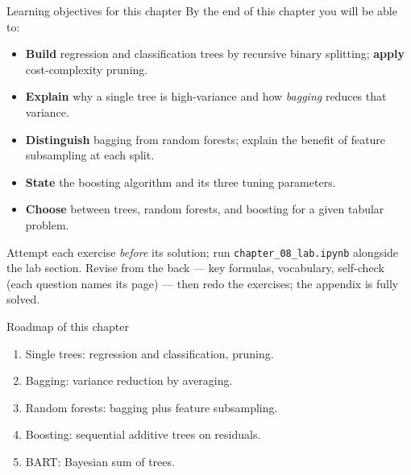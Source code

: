 \documentclass[aspectratio=169,11pt]{beamer}
\begin{document}
\begin{frame}{Learning objectives for this chapter}
  \small
  By the end of this chapter you will be able to:
  \begin{itemize}
    \item \textbf{Build} regression and classification trees by
          recursive binary splitting; \textbf{apply} cost-complexity
          pruning.
    \item \textbf{Explain} why a single tree is high-variance and how
          \emph{bagging} reduces that variance.
    \item \textbf{Distinguish} bagging from random forests; explain
          the benefit of feature subsampling at each split.
    \item \textbf{State} the boosting algorithm and its three tuning
          parameters.
    \item \textbf{Choose} between trees, random forests, and boosting
          for a given tabular problem.
  \end{itemize}
  \begin{readme}
    \footnotesize Attempt each exercise \emph{before} its solution; run
    \texttt{chapter\_08\_lab.ipynb} alongside the lab section. Revise from the
    back --- key formulas, vocabulary, self-check (each question names its
    page) --- then redo the exercises; the appendix is fully solved.
  \end{readme}
\end{frame}


\begin{frame}{Roadmap of this chapter}
  \begin{takeaway}
    \begin{enumerate}
      \item Single trees: regression and classification, pruning.
      \item Bagging: variance reduction by averaging.
      \item Random forests: bagging plus feature subsampling.
      \item Boosting: sequential additive trees on residuals.
      \item BART: Bayesian sum of trees.
    \end{enumerate}
  \end{takeaway}
\end{frame}

\end{document}
